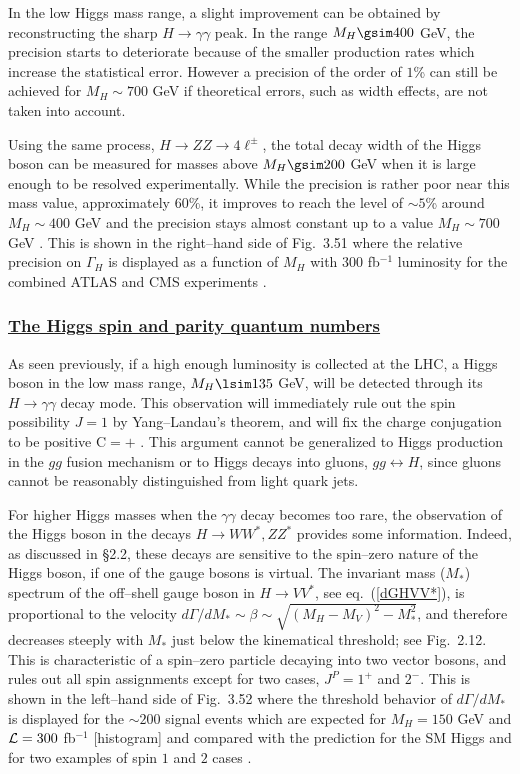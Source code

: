 In the low Higgs mass range, a slight improvement can be obtained by
reconstructing the sharp $H \to \gamma \gamma$ peak. In the range $M_H \gsim
400$ GeV, the precision starts to deteriorate because of the smaller production
rates which increase the statistical error.  However a precision of the order of
$1$\% can still be achieved for $M_H\sim 700$ GeV if theoretical errors, such
as width effects, are not taken into account.  \s

Using the same process, $H \to ZZ \to 4\ell^\pm$, the total decay width of the
Higgs boson can be measured for masses above $M_H \gsim 200$ GeV when it is
large enough to be resolved experimentally. While the precision is rather poor
near this mass value, approximately $60\%$,  it improves to reach the
level of $\sim 5$\% around $M_H \sim 400$ GeV and the precision stays almost
constant up to a value $M_H\sim 700$ GeV \cite{pp-meas-mass+width}. This is
shown in the right--hand side of Fig.~3.51 where the relative precision on
$\Gamma_H$ is displayed as a function of $M_H$ with 300 fb$^{-1}$ luminosity
for the combined ATLAS and CMS experiments \cite{Mass-Fabiola}.  

\subsubsection*{\underline{The Higgs spin and parity quantum numbers}}

As seen previously, if a high enough luminosity is collected at the LHC, a
Higgs boson in the low mass range, $M_H \lsim 135$ GeV, will be detected
through its $H \to \gamma \gamma$ decay mode. This observation will immediately
rule out the spin possibility $J=1$ by Yang--Landau's theorem, and will fix the charge
conjugation to be positive C$=+$ \cite{Yang-theorem}. This argument cannot be
generalized to Higgs production in the $gg$ fusion mechanism or to Higgs decays
into gluons, $gg \leftrightarrow H$, since gluons cannot be reasonably
distinguished from light quark jets. \s

For higher Higgs masses when the $\gamma \gamma$ decay becomes too rare, the
observation of the Higgs boson in the decays $H \to WW^*, ZZ^*$ provides some
information. Indeed, as discussed in \S2.2, these decays are sensitive to the
spin--zero nature of the Higgs boson, if one of the gauge bosons is virtual. 
The invariant mass ($M_*$) spectrum of the off--shell gauge boson in $H \to
VV^*$, see eq.~(\ref{dGHVV*}), is proportional to the velocity $d\Gamma/dM_*
\sim \beta \sim \sqrt{(M_H -M_V)^2 -M_*^2}$, and therefore decreases steeply
with $M_*$ just below the kinematical threshold; see Fig.~2.12. This is
characteristic of a spin--zero particle decaying into two vector bosons, and
rules out all spin assignments except for two cases, $J^P=1^+$ and $2^-$.  This
is shown in the left--hand side of Fig.~3.52 where the threshold behavior of
$d\Gamma/dM_*$ is displayed for the $\sim 200$ signal events which are expected
for $M_H=150$ GeV and $ {\cal L} =300$ fb$^{-1}$ [histogram] and compared with
the prediction for the SM Higgs and for two examples of spin $1$ and $2$ cases
\cite{CPHVVchoi}.\s 

